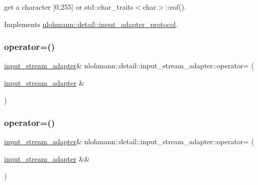 get a character \mbox{[}0,255\mbox{]} or std\+::char\+\_\+traits$<$char$>$\+::eof(). 



Implements \hyperlink{structnlohmann_1_1detail_1_1input__adapter__protocol_aac10a6a4048a8ce8e2ed50277692a3ca}{nlohmann\+::detail\+::input\+\_\+adapter\+\_\+protocol}.

\mbox{\label{classnlohmann_1_1detail_1_1input__stream__adapter_aeac5048221929b8f7558d1698dd0fb3a}} 
\subsubsection{\texorpdfstring{operator=()}{operator=()}\hspace{0.1cm}{\footnotesize\ttfamily [1/2]}}
{\footnotesize\ttfamily \hyperlink{classnlohmann_1_1detail_1_1input__stream__adapter}{input\+\_\+stream\+\_\+adapter}\& nlohmann\+::detail\+::input\+\_\+stream\+\_\+adapter\+::operator= (\begin{DoxyParamCaption}\item[{\hyperlink{classnlohmann_1_1detail_1_1input__stream__adapter}{input\+\_\+stream\+\_\+adapter} \&}]{ }\end{DoxyParamCaption})\hspace{0.3cm}{\ttfamily [delete]}}

\mbox{\label{classnlohmann_1_1detail_1_1input__stream__adapter_a3577dff99cc91968557b52959b0363e4}} 
\subsubsection{\texorpdfstring{operator=()}{operator=()}\hspace{0.1cm}{\footnotesize\ttfamily [2/2]}}
{\footnotesize\ttfamily \hyperlink{classnlohmann_1_1detail_1_1input__stream__adapter}{input\+\_\+stream\+\_\+adapter}\& nlohmann\+::detail\+::input\+\_\+stream\+\_\+adapter\+::operator= (\begin{DoxyParamCaption}\item[{\hyperlink{classnlohmann_1_1detail_1_1input__stream__adapter}{input\+\_\+stream\+\_\+adapter} \&\&}]{ }\end{DoxyParamCaption})\hspace{0.3cm}{\ttfamily [delete]}}



